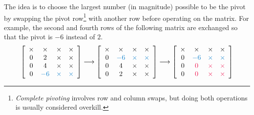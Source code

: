 The idea is to choose the largest number (in magnitude) possible to be the pivot by swapping the pivot row\footnote{\emph{Complete pivoting} involves row and column swaps, but doing both operations is usually considered overkill.}
 with another row before operating on the matrix.
For example, the second and fourth rows of the following matrix are exchanged so that the pivot is $-6$ instead of $2$.
%
\begin{align*}
\left[\begin{array}{cccc}
\times & \times & \times & \times\\
0 & 2 & \times & \times\\
0 & 4 & \times & \times\\
0 & \textcolor{blue}{-6} & \textcolor{blue}\times & \textcolor{blue}\times\\
\end{array}\right]
\longrightarrow
\left[\begin{array}{cccc}
\times & \times & \times & \times\\
0 & \textcolor{blue}{-6} & \textcolor{blue}\times & \textcolor{blue}\times\\
0 & 4 & \times & \times\\
0 & 2 & \times & \times\\
\end{array}\right]
\longrightarrow
\left[\begin{array}{cccc}
\times & \times & \times & \times\\
0 & \textcolor{blue}{-6} & \textcolor{blue}\times & \textcolor{blue}\times\\
0 & \textcolor{red}0 & \textcolor{red}\times & \textcolor{red}\times\\
0 & \textcolor{red}0 & \textcolor{red}\times & \textcolor{red}\times\\
\end{array}\right]
\end{align*}


